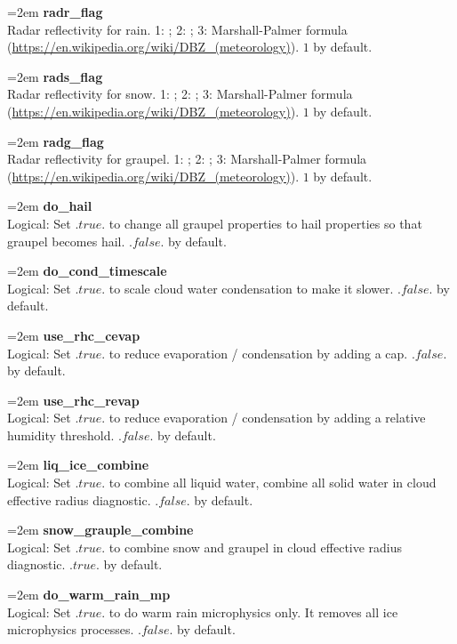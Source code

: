 \documentclass[letterpaper,titlepage,10pt]{article}
\numberwithin{equation}{section}
\begin{document}
\begin{appendices}
\hangindent=2em
\textbf{radr\_flag}\\ Radar reflectivity for rain. 1: \citet{stoelinga2005simu}; 2: \citet{smith1975rada, tong2005ense}; 3: Marshall-Palmer formula (\url{https://en.wikipedia.org/wiki/DBZ_(meteorology)}). $1$ by default.

\hangindent=2em
\textbf{rads\_flag}\\ Radar reflectivity for snow. 1: \citet{stoelinga2005simu}; 2: \citet{smith1975rada, tong2005ense}; 3: Marshall-Palmer formula (\url{https://en.wikipedia.org/wiki/DBZ_(meteorology)}). $1$ by default.

\hangindent=2em
\textbf{radg\_flag}\\ Radar reflectivity for graupel. 1: \citet{stoelinga2005simu}; 2: \citet{smith1975rada, tong2005ense}; 3: Marshall-Palmer formula (\url{https://en.wikipedia.org/wiki/DBZ_(meteorology)}). $1$ by default.

\hangindent=2em
\textbf{do\_hail}\\ Logical: Set $.true.$ to change all graupel properties to hail properties so that graupel becomes hail. $.false.$ by default.

\hangindent=2em
\textbf{do\_cond\_timescale}\\ Logical: Set $.true.$ to scale cloud water condensation to make it slower. $.false.$ by default.

\hangindent=2em
\textbf{use\_rhc\_cevap}\\ Logical: Set $.true.$ to reduce evaporation / condensation by adding a cap. $.false.$ by default.

\hangindent=2em
\textbf{use\_rhc\_revap}\\ Logical: Set $.true.$ to reduce evaporation / condensation by adding a relative humidity threshold. $.false.$ by default.

\hangindent=2em
\textbf{liq\_ice\_combine}\\ Logical: Set $.true.$ to combine all liquid water, combine all solid water in cloud effective radius diagnostic. $.false.$ by default.

\hangindent=2em
\textbf{snow\_grauple\_combine}\\ Logical: Set $.true.$ to combine snow and graupel in cloud effective radius diagnostic. $.true.$ by default.

\hangindent=2em
\textbf{do\_warm\_rain\_mp}\\ Logical: Set $.true.$ to do warm rain microphysics only. It removes all ice microphysics processes. $.false.$ by default.


\end{appendices}
\end{document}
